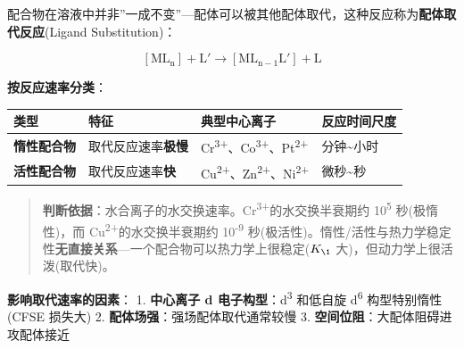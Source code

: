 配合物在溶液中并非''一成不变''---配体可以被其他配体取代，这种反应称为\textbf{配体取代反应}(Ligand Substitution)：

\[[\mathrm{ML_n}] + \mathrm{L'} \rightarrow [\mathrm{ML_{n-1}L'}] + \mathrm{L}\]

\textbf{按反应速率分类}：

{\def\LTcaptype{none} %
\begin{longtable}[]{@{}
  >{\raggedright\arraybackslash}p{}
  >{\raggedright\arraybackslash}p{}
  >{\raggedright\arraybackslash}p{}
  >{\raggedright\arraybackslash}p{}@{}}
\toprule\noalign{}
\begin{minipage}[b]{\linewidth}\raggedright
类型
\end{minipage} & \begin{minipage}[b]{\linewidth}\raggedright
特征
\end{minipage} & \begin{minipage}[b]{\linewidth}\raggedright
典型中心离子
\end{minipage} & \begin{minipage}[b]{\linewidth}\raggedright
反应时间尺度
\end{minipage} \\
\midrule\noalign{}
\endhead
\bottomrule\noalign{}
\endlastfoot
\textbf{惰性配合物} & 取代反应速率\textbf{极慢} & Cr\textsuperscript{3+}、Co\textsuperscript{3+}、Pt\textsuperscript{2+} & 分钟\textasciitilde 小时 \\
\textbf{活性配合物} & 取代反应速率\textbf{快} & Cu\textsuperscript{2+}、Zn\textsuperscript{2+}、Ni\textsuperscript{2+} & 微秒\textasciitilde 秒 \\
\end{longtable}
}

\begin{quote}
\textbf{判断依据}：水合离子的水交换速率。Cr\textsuperscript{3+}的水交换半衰期约 10\textsuperscript{5} 秒(极惰性)，而 Cu\textsuperscript{2+}的水交换半衰期约 10\textsuperscript{-9} 秒(极活性)。惰性/活性与热力学稳定性\textbf{无直接关系}---一个配合物可以热力学上很稳定(\(K_{\1}\) 大)，但动力学上很活泼(取代快)。
\end{quote}

\textbf{影响取代速率的因素}：
1. \textbf{中心离子 d 电子构型}：d\textsuperscript{3} 和低自旋 d\textsuperscript{6} 构型特别惰性(CFSE 损失大)
2. \textbf{配体场强}：强场配体取代通常较慢
3. \textbf{空间位阻}：大配体阻碍进攻配体接近

